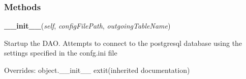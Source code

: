
  \subsubsection{Methods}

    \vspace{0.5ex}

\hspace{.8\funcindent}\begin{boxedminipage}{\funcwidth}

    \raggedright \textbf{\_\_init\_\_}(\textit{self}, \textit{configFilePath}, \textit{outgoingTableName})

\setlength{\parskip}{2ex}
    Startup the DAO. Attempts to connect to the postgresql database using 
    the settings specified in the confg.ini file

\setlength{\parskip}{1ex}
      Overrides: object.\_\_init\_\_ 	extit{(inherited documentation)}

    \end{boxedminipage}

    \label{src:dao:classification_dao:ClassificationDAO:upsertClassification}

    \vspace{0.5ex}

